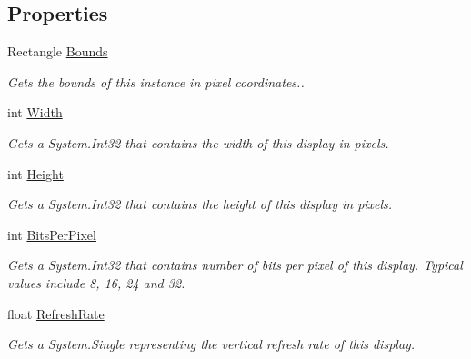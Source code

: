 \subsection*{Properties}
\begin{DoxyCompactItemize}
\item 
Rectangle \hyperlink{class_open_t_k_1_1_display_device_a8bd53ee06b975cd39ae8c296f42c72ab}{Bounds}
\begin{DoxyCompactList}\small\item\em Gets the bounds of this instance in pixel coordinates.. \end{DoxyCompactList}\item 
int \hyperlink{class_open_t_k_1_1_display_device_a43b8973ddea03c873aa0006785d7da4d}{Width}
\begin{DoxyCompactList}\small\item\em Gets a System.\-Int32 that contains the width of this display in pixels.\end{DoxyCompactList}\item 
int \hyperlink{class_open_t_k_1_1_display_device_aa5120fc7bcbcfad2ab9178762b248a8b}{Height}
\begin{DoxyCompactList}\small\item\em Gets a System.\-Int32 that contains the height of this display in pixels.\end{DoxyCompactList}\item 
int \hyperlink{class_open_t_k_1_1_display_device_af22b160771cce81304e997ea883efcb0}{Bits\-Per\-Pixel}
\begin{DoxyCompactList}\small\item\em Gets a System.\-Int32 that contains number of bits per pixel of this display. Typical values include 8, 16, 24 and 32.\end{DoxyCompactList}\item 
float \hyperlink{class_open_t_k_1_1_display_device_aeafbdb3c00fd95587654742b62ff7145}{Refresh\-Rate}
\begin{DoxyCompactList}\small\item\em Gets a System.\-Single representing the vertical refresh rate of this display. \end{DoxyCompactList}\item 

\end{DoxyCompactItemize}

